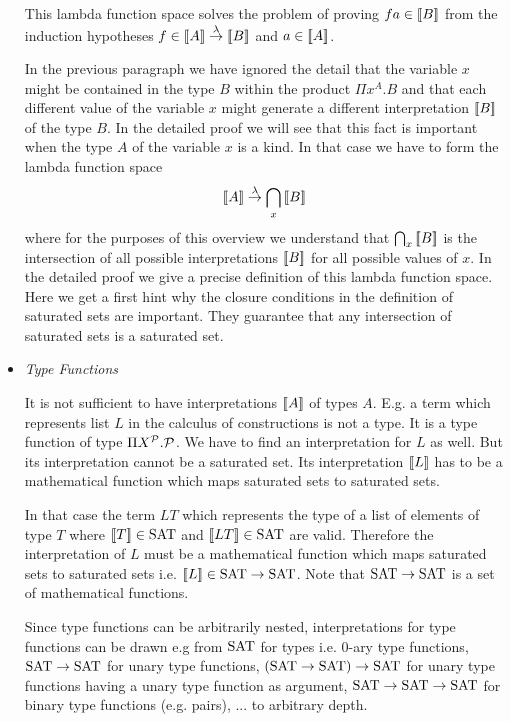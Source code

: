 \begin{itemize}
        This lambda function space solves the problem of proving $fa \in {{[\![}B {]\!]}}$ from the induction hypotheses $f \in {{[\![}A {]\!]}} \stackrel{\lambda}{\to} {{[\![} B {]\!]}}$
        and $a \in {{[\![}A {]\!]}}$.

        In the previous paragraph we have ignored the detail that the variable
        $x$ might be contained in the type $B$ within the product $\Pi x^A.B$
        and that each different value of the variable $x$ might generate a
        different interpretation ${{[\![} B {]\!]}}$ of the type $B$. In the detailed
        proof we will see that this fact is important when the type $A$ of the
        variable $x$ is a kind. In that case we have to form the lambda function
        space
        $$
            {{[\![} A {]\!]}} \stackrel{\lambda}{\to} \bigcap_x {{[\![} B {]\!]}}
        $$
        where for the purposes of this overview we understand that $\bigcap_x
        {{[\![} B {]\!]}}$ is the intersection of all possible interpretations ${{[\![} B {]\!]}}$ for all possible values of $x$. In the detailed proof we give a
        precise definition of this lambda function space. Here we get a first
        hint why the closure conditions in the definition of saturated sets are
        important. They guarantee that any intersection of saturated sets is a
        saturated set.


    \item \emph{Type Functions}

        It is not sufficient to have interpretations ${{[\![} A {]\!]}}$ of types $A$.
        E.g. a term which represents list $L$ in the calculus of constructions
        is not a type. It is a type function of type $\Pi X^{\cal P} . {\cal P}$. We
        have to find an interpretation for $L$ as well. But its interpretation
        cannot be a saturated set. Its interpretation ${{[\![} L {]\!]}}$ has to be a
        mathematical function which maps saturated sets to saturated sets.

        In that case the term $L T$ which represents the type of a list of
        elements of type $T$ where ${{[\![} T {]\!]}} \in \text{SAT}$ and ${{[\![} L T {]\!]}} \in
        \text{SAT}$ are valid. Therefore the interpretation of $L$ must be a
        mathematical function which maps saturated sets to saturated sets i.e.
        ${{[\![} L {]\!]}} \in \text{SAT} \to \text{SAT}$.  Note that $\text{SAT} \to \text{SAT}$ is a set of
        mathematical functions.

        Since type functions can be arbitrarily nested, interpretations for type
        functions can be drawn e.g from $\text{SAT}$ for types i.e. $0$-ary type
        functions, $\text{SAT} \to \text{SAT}$ for unary type functions, $(\text{SAT} \to \text{SAT})
        \to \text{SAT}$ for unary type functions having a unary type function as
        argument, $\text{SAT} \to \text{SAT} \to \text{SAT}$ for binary type functions (e.g.
        pairs), ... to arbitrary depth.


\end{itemize}
